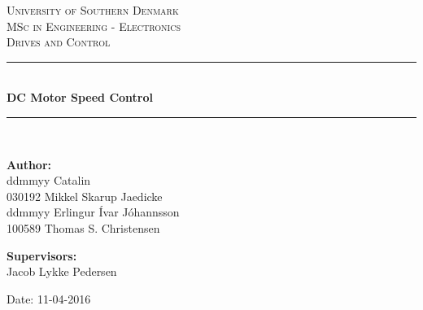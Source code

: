 \begin{titlepage}
\begin{center}

\textsc{\LARGE University of Southern Denmark}\\[1.5cm]
\textsc{\Large MSc in Engineering - Electronics}\\
\textsc{\large Drives and Control}\\[0.5cm]
\vfill
\hrule ~\\[0.3cm]
{ \huge \bfseries DC Motor Speed Control\\[0.4cm] }
\hrule ~\\[1.5cm]
\vfill

\begin{minipage}[t]{.49\textwidth}
\begin{flushleft} \large
\textbf{Author:}\\
ddmmyy Catalin\\
030192 Mikkel Skarup Jaedicke\\
ddmmyy Erlingur Ívar Jóhannsson\\
100589 Thomas S. Christensen
\end{flushleft}
\end{minipage}
\begin{minipage}[t]{.49\textwidth}
\begin{flushright} \large
\textbf{Supervisors:} \\
Jacob Lykke Pedersen\\
\end{flushright}
\end{minipage}

\vspace{1.2cm}
Date: 11-04-2016

\end{center}
\end{titlepage}
